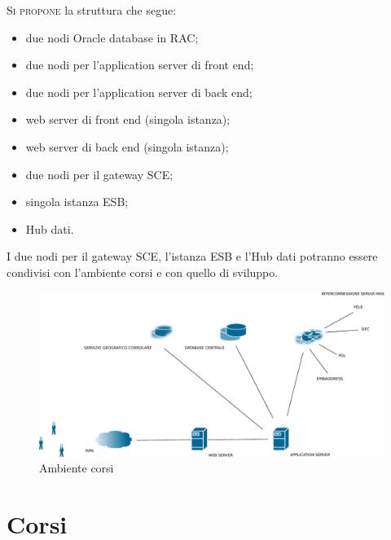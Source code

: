 \documentclass[headinclude,footinclude,a4paper,11pt,final]{scrreprt}
\begin{document}
\lettrine{S}{i propone} la struttura che segue:
\begin{itemize}
\item due nodi Oracle database in RAC;
\item due nodi per l'application server di front end;
\item due nodi per l'application server di back end;
\item web server di front end (singola istanza);
\item web server di back end (singola istanza);
\item due nodi per il gateway SCE;
\item singola istanza ESB;
\item Hub dati.
\end{itemize}

I due nodi per il gateway SCE, l'istanza ESB e l'Hub dati potranno essere condivisi con l'ambiente corsi e con quello di sviluppo.

\begin{figure}[ht]
\includegraphics[scale=0.45]{corsi.pdf}
\bigskip
\caption{Ambiente corsi}
\bigskip
\bigskip
\end{figure}

\section{Corsi}
\end{document}
